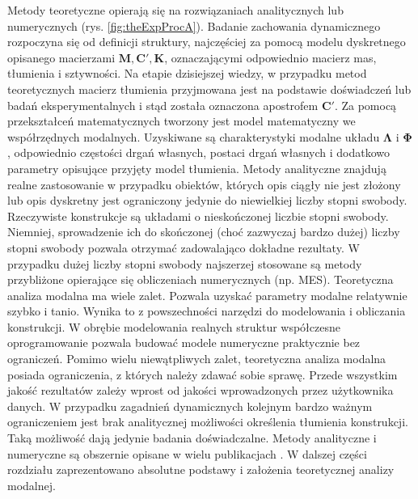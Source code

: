 Metody teoretyczne opierają się na rozwiązaniach analitycznych lub numerycznych (rys. \ref{fig:theExpProcA}). Badanie zachowania dynamicznego rozpoczyna się od definicji struktury, najczęściej za pomocą modelu dyskretnego opisanego macierzami $\mathbf{M}, \mathbf{C}', \mathbf{K}$, oznaczającymi odpowiednio macierz mas, tłumienia i sztywności. Na etapie dzisiejszej wiedzy, w przypadku metod teoretycznych macierz tłumienia przyjmowana jest na podstawie doświadczeń lub badań eksperymentalnych i stąd została oznaczona apostrofem $\mathbf{C'}$. Za pomocą przekształceń matematycznych tworzony jest model matematyczny we współrzędnych modalnych. Uzyskiwane są charakterystyki modalne układu $\mathbf{\Lambda}$ i $\mathbf{\Phi}$, odpowiednio częstości drgań własnych, postaci drgań własnych i dodatkowo parametry opisujące przyjęty model tłumienia. Metody analityczne znajdują realne zastosowanie w przypadku obiektów, których opis ciągły nie jest złożony lub opis dyskretny jest ograniczony jedynie do niewielkiej liczby stopni swobody. Rzeczywiste konstrukcje są układami o nieskończonej liczbie stopni swobody. Niemniej, sprowadzenie ich do skończonej (choć zazwyczaj bardzo dużej) liczby stopni swobody pozwala otrzymać zadowalająco dokładne rezultaty. W przypadku dużej liczby stopni swobody najszerzej stosowane są metody przybliżone opierające się obliczeniach numerycznych (np. MES). Teoretyczna analiza modalna ma wiele zalet. Pozwala uzyskać parametry modalne relatywnie szybko i tanio. Wynika to z powszechności narzędzi do modelowania i obliczania konstrukcji. W obrębie modelowania realnych struktur współczesne oprogramowanie pozwala budować modele numeryczne praktycznie bez ograniczeń. Pomimo wielu niewątpliwych zalet, teoretyczna analiza modalna posiada ograniczenia, z których należy zdawać sobie sprawę. Przede wszystkim jakość rezultatów zależy wprost od jakości wprowadzonych przez użytkownika danych. W przypadku zagadnień dynamicznych kolejnym bardzo ważnym ograniczeniem jest brak analitycznej możliwości określenia tłumienia konstrukcji. Taką możliwość dają jedynie badania doświadczalne. Metody analityczne i numeryczne są obszernie opisane w wielu publikacjach \parencite{Chmielewski1998,Chopra2012a,Rucka2014}. W dalszej części rozdziału zaprezentowano absolutne podstawy i założenia teoretycznej analizy modalnej.


